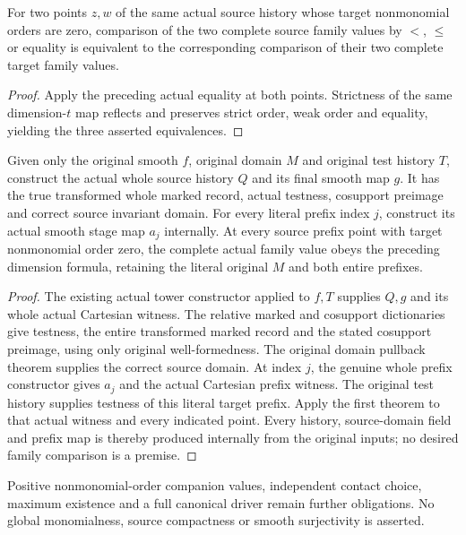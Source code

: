 \begin{theorem}
\label{hir:smooth-original-family-monomial-leaf-comparisons}
\leanok
{}
For two points $z,w$ of the same actual source history whose target
nonmonomial orders are zero, comparison of the two complete source family
values by $<$, $\leq$ or equality is equivalent to the corresponding
comparison of their two complete target family values.
\end{theorem}
\begin{proof}
Apply the preceding actual equality at both points.  Strictness of the
same dimension-$t$ map reflects and preserves strict order, weak order
and equality, yielding the three asserted equivalences.
\end{proof}

\begin{theorem}
\label{hir:smooth-original-family-monomial-leaf-prefixes}
\leanok
{}
Given only the original smooth $f$, original domain $M$ and original test
history $T$, construct the actual whole source history $Q$ and its final
smooth map $g$.  It has the true transformed whole marked record, actual
testness, cosupport preimage and correct source invariant domain.  For
every literal prefix index $j$, construct its actual smooth stage map
$a_j$ internally.  At every source prefix point with target nonmonomial
order zero, the complete actual family value obeys the preceding dimension
formula, retaining the literal original $M$ and both entire prefixes.
\end{theorem}
\begin{proof}
The existing actual tower constructor applied to $f,T$ supplies $Q,g$
and its whole actual Cartesian witness.  The relative marked and cosupport
dictionaries give testness, the entire transformed marked record and
the stated cosupport preimage, using only original well-formedness.
The original domain pullback theorem supplies the correct source domain.
At index $j$, the genuine whole prefix constructor gives $a_j$ and the
actual Cartesian prefix witness.  The original test history supplies
testness of this literal target prefix.  Apply the first theorem to that
actual witness and every indicated point.  Every history, source-domain
field and prefix map is thereby produced internally from the original
inputs; no desired family comparison is a premise.
\end{proof}

Positive nonmonomial-order companion values, independent contact choice,
maximum existence and a full canonical driver remain further obligations.
No global monomialness, source compactness or smooth surjectivity is asserted.
